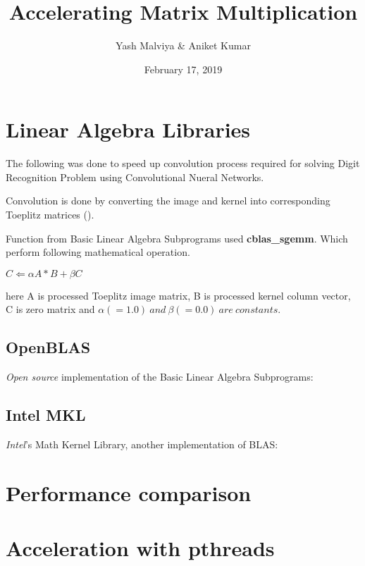 \documentclass{article}
\author{Yash Malviya \& Aniket Kumar}
\title{Accelerating Matrix Multiplication}
\date{February 17, 2019}
\begin{document}
\maketitle

\section{Linear Algebra Libraries}

The following was done to speed up convolution process 
required for solving Digit Recognition Problem using 
Convolutional Nueral Networks. 

Convolution is done by converting the image and kernel 
into corresponding Toeplitz matrices
(\textcite{wiki:toepliz}).

Function from Basic Linear Algebra Subprograms used 
\textbf{cblas\_sgemm}. Which perform following 
mathematical operation.

\begin{math}
    C \Leftarrow \alpha A*B + \beta C
\end{math}

here A is processed Toeplitz image matrix,
B is processed kernel column vector, 
C is zero matrix and 
\begin{math}
    \alpha(=1.0)\ and\ \beta(=0.0)\ are\ constants.
\end{math}

\subsection{OpenBLAS}

\emph{Open source} implementation of the 
Basic Linear Algebra Subprograms: \textcite{OpenBLAS:wiki} 

\subsection{Intel MKL}

\emph{Intel}'s Math Kernel Library, another 
implementation of BLAS: \textcite{IntelMKL:doc}

\section{Performance comparison}

\section{Acceleration with pthreads}
\end{document}
